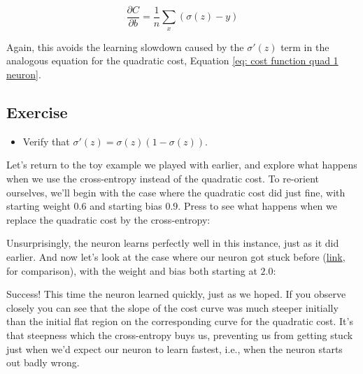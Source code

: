 \documentclass[a4paper,11pt,twoside]{report}
\begin{document}
 \begin{equation}
\frac{\partial C}{\partial b}=
\frac{1}{n}	\sum_x (\sigma(z)-y)
\label{eq: derivative b cost cross-entropy final}
\end{equation}

Again, this avoids the learning slowdown caused by the $\sigma'(z)$ term in the analogous equation for the quadratic cost, Equation \ref{eq: cost function quad 1 neuron}.

\subsection*{Exercise}
\label{Exercise: derivative of sigmoid}
\begin{itemize}
\item Verify that $\sigma'(z)=\sigma(z)(1-\sigma(z))$.
\end{itemize}


Let's return to the toy example we played with earlier, and explore what happens when we use the cross-entropy instead of the quadratic cost. To re-orient ourselves, we'll begin with the case where the quadratic cost did just fine, with starting weight $0.6$ and starting bias $0.9$. Press  to see what happens when we replace the quadratic cost by the cross-entropy:

%

Unsurprisingly, the neuron learns perfectly well in this instance, just as it did earlier. And now let's look at the case where our neuron got stuck before (\hyperref[anim: cost quadratic small w b]{link}, for comparison), with the weight and bias both starting at $2.0$:

Success! This time the neuron learned quickly, just as we hoped. If you observe closely you can see that the slope of the cost curve was much steeper initially than the initial flat region on the corresponding curve for the quadratic cost. It's that steepness which the cross-entropy buys us, preventing us from getting stuck just when we'd expect our neuron to learn fastest, i.e., when the neuron starts out badly wrong.\\
\end{document}

